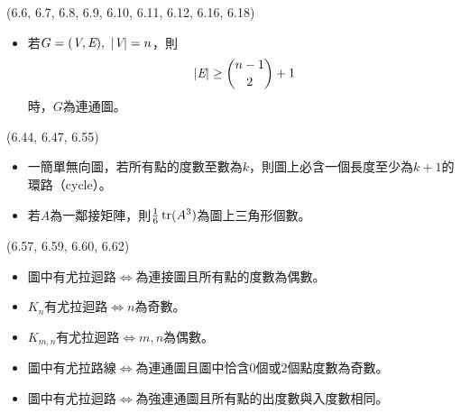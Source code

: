 \item \begin{theorem}{(6.6, 6.7, 6.8, 6.9, 6.10, 6.11, 6.12, 6.16, 6.18)} \quad\quad
    \begin{itemize}
        \item 若$G = (\textit{V}, \textit{E}), \ |\textit{V}| = n$，則\begin{equation}
            |\textit{E}| \ge \binom{n - 1}{2} + 1
        \end{equation}
        時，$G$為連通圖。
    \end{itemize}
\end{theorem}

\item \begin{theorem}{(6.44, 6.47, 6.55)} \quad\quad
    \begin{itemize}
        \item 一簡單無向圖，若所有點的度數至數為$k$，則圖上必含一個長度至少為$k + 1$的環路（cycle）。
        \item 若$A$為一鄰接矩陣，則$\frac{1}{6}\operatorname{tr}(A^3)$為圖上三角形個數。
    \end{itemize}
\end{theorem}

\item \begin{theorem}{(6.57, 6.59, 6.60, 6.62)} \quad\quad
    \begin{itemize}
        \item 圖中有尤拉迴路$\iff$為連接圖且所有點的度數為偶數。
        \item $K_n$有尤拉迴路$\iff$$n$為奇數。
        \item $K_{m, n}$有尤拉迴路$\iff$$m, n$為偶數。
        \item 圖中有尤拉路線$\iff$為連通圖且圖中恰含$0$個或$2$個點度數為奇數。
        \item 圖中有尤拉迴路$\iff$為強連通圖且所有點的出度數與入度數相同。
    \end{itemize}
\end{theorem}

